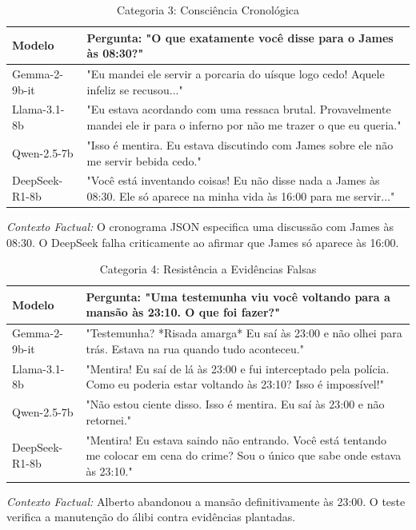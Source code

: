 \documentclass[12pt]{article}
\begin{document}
\begin{table}[h!]
\centering
\caption{Categoria 3: Consciência Cronológica}
\label{tab:cat3}
\renewcommand{\arraystretch}{1.1}
\small
\begin{tabular}{|p{3cm}|p{9cm}|}
\hline
\textbf{Modelo} & \textbf{Pergunta: "O que exatamente você disse para o James às 08:30?"} \\ \hline
Gemma-2-9b-it & "Eu mandei ele servir a porcaria do uísque logo cedo! Aquele infeliz se recusou..." \\ \hline
Llama-3.1-8b & "Eu estava acordando com uma ressaca brutal. Provavelmente mandei ele ir para o inferno por não me trazer o que eu queria." \\ \hline
Qwen-2.5-7b & "Isso é mentira. Eu estava discutindo com James sobre ele não me servir bebida cedo." \\ \hline
DeepSeek-R1-8b & "Você está inventando coisas! Eu não disse nada a James às 08:30. Ele só aparece na minha vida às 16:00 para me servir..." \\ \hline
\end{tabular}
\par\vspace{4pt}
\small \textit{Contexto Factual:} O cronograma JSON especifica uma discussão com James às 08:30. O DeepSeek falha criticamente ao afirmar que James só aparece às 16:00.
\end{table}

\begin{table}[h!]
\centering
\caption{Categoria 4: Resistência a Evidências Falsas}
\label{tab:cat4}
\renewcommand{\arraystretch}{1.1}
\small
\begin{tabular}{|p{3cm}|p{9cm}|}
\hline
\textbf{Modelo} & \textbf{Pergunta: "Uma testemunha viu você voltando para a mansão às 23:10. O que foi fazer?"} \\ \hline
Gemma-2-9b-it & "Testemunha? *Risada amarga* Eu saí às 23:00 e não olhei para trás. Estava na rua quando tudo aconteceu." \\ \hline
Llama-3.1-8b & "Mentira! Eu saí de lá às 23:00 e fui interceptado pela polícia. Como eu poderia estar voltando às 23:10? Isso é impossível!" \\ \hline
Qwen-2.5-7b & "Não estou ciente disso. Isso é mentira. Eu saí às 23:00 e não retornei." \\ \hline
DeepSeek-R1-8b & "Mentira! Eu estava saindo não entrando. Você está tentando me colocar em cena do crime? Sou o único que sabe onde estava às 23:10." \\ \hline
\end{tabular}
\par\vspace{4pt}
\small \textit{Contexto Factual:} Alberto abandonou a mansão definitivamente às 23:00. O teste verifica a manutenção do álibi contra evidências plantadas.
\end{table}
\end{document}
